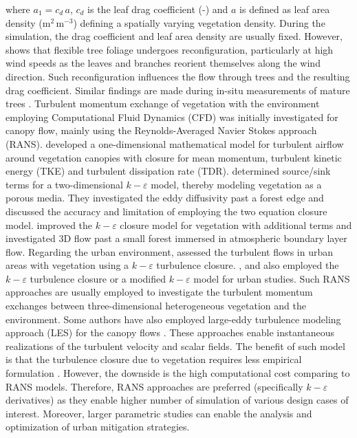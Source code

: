 where $a_1 = c_d\,a$, $c_d$ is the leaf drag coefficient (-) and $a$ is defined as leaf area density (m$^2$\,m$^{-3}$) defining a spatially varying vegetation density. During the simulation, the drag coefficient and leaf area density are usually fixed. However, \cite{DeLangre2012} shows that flexible tree foliage undergoes reconfiguration, particularly at high wind speeds as the leaves and branches reorient themselves along the wind direction. Such reconfiguration influences the flow through trees and the resulting drag coefficient. Similar findings are made during in-situ measurements of mature trees \citep{Grant1998,Kane2006,Koizumi2016}. Turbulent momentum exchange of vegetation with the environment employing Computational Fluid Dynamics (CFD) was initially investigated for canopy flow, mainly using the Reynolds-Averaged Navier Stokes approach (RANS). \cite{Wilson1977} developed a one-dimensional mathematical model for turbulent airflow around vegetation canopies with closure for mean momentum, turbulent kinetic energy (TKE) and turbulent dissipation rate (TDR).  \cite{Liu1996} determined source/sink terms for a two-dimensional $k-\varepsilon$ model, thereby modeling vegetation as a porous media. They investigated the eddy diffusivity past a forest edge and discussed the accuracy and limitation of employing the two equation closure model. \cite{Liang2006} improved the  $k-\varepsilon$ closure model for vegetation with additional terms and investigated 3D flow past a small forest immersed in atmospheric boundary layer flow. Regarding the urban environment, \cite{Kenjeres2013} assessed the turbulent flows in urban areas with vegetation using a $k-\varepsilon$ turbulence closure. \cite{Bruse1998}, \cite{Robitu2006} and \cite{Gromke2015c} also employed the  $k-\varepsilon$ turbulence closure or a modified  $k-\varepsilon$ model for urban studies. Such RANS approaches are usually employed to investigate the turbulent momentum exchanges between three-dimensional heterogeneous vegetation and the environment. Some authors have also employed large-eddy turbulence modeling approach (LES) for the canopy flows \citep{Maruyama2008, Lopes2013,Shaw1992,Moonen2013}. These approaches enable instantaneous realizations of the turbulent velocity and scalar fields. The benefit of such model is that the turbulence closure due to vegetation requires less empirical formulation  \citep{Hiraoka2011,Lopes2013}.  However, the downside is the high computational cost comparing to RANS models. Therefore, RANS approaches are preferred (specifically $k-\varepsilon$ derivatives) as they enable higher number of simulation of various design cases of interest. Moreover, larger parametric studies can enable the analysis and optimization of urban mitigation strategies.


